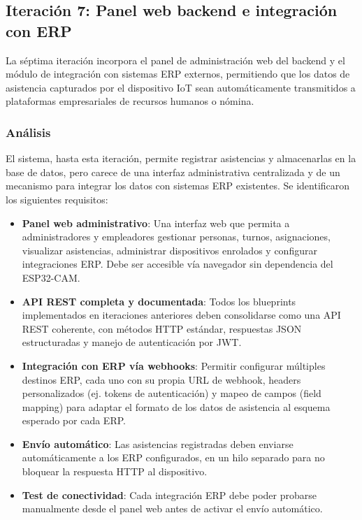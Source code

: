 
\subsection{Iteración 7: Panel web backend e integración con ERP}

La séptima iteración incorpora el panel de administración web del backend y el módulo de integración con sistemas ERP externos, permitiendo que los datos de asistencia capturados por el dispositivo IoT sean automáticamente transmitidos a plataformas empresariales de recursos humanos o nómina.

\subsubsection{Análisis}

El sistema, hasta esta iteración, permite registrar asistencias y almacenarlas en la base de datos, pero carece de una interfaz administrativa centralizada y de un mecanismo para integrar los datos con sistemas ERP existentes. Se identificaron los siguientes requisitos:

\begin{itemize}
    \item \textbf{Panel web administrativo}: Una interfaz web que permita a administradores y empleadores gestionar personas, turnos, asignaciones, visualizar asistencias, administrar dispositivos enrolados y configurar integraciones ERP. Debe ser accesible vía navegador sin dependencia del ESP32-CAM.
    \item \textbf{API REST completa y documentada}: Todos los blueprints implementados en iteraciones anteriores deben consolidarse como una API REST coherente, con métodos HTTP estándar, respuestas JSON estructuradas y manejo de autenticación por JWT.
    \item \textbf{Integración con ERP vía webhooks}: Permitir configurar múltiples destinos ERP, cada uno con su propia URL de webhook, headers personalizados (ej. tokens de autenticación) y mapeo de campos (field mapping) para adaptar el formato de los datos de asistencia al esquema esperado por cada ERP.
    \item \textbf{Envío automático}: Las asistencias registradas deben enviarse automáticamente a los ERP configurados, en un hilo separado para no bloquear la respuesta HTTP al dispositivo.
    \item \textbf{Test de conectividad}: Cada integración ERP debe poder probarse manualmente desde el panel web antes de activar el envío automático.
\end{itemize}

